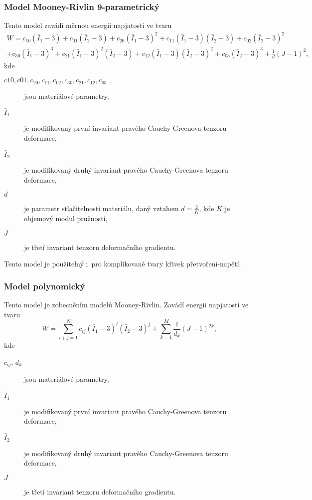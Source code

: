 \subsubsection{Model Mooney-Rivlin 9-parametrický}
Tento model zavádí měrnou energii napjatosti ve tvaru
\begin{multline}
W
= c_{10} \left(\bar{I}_1 - 3\right)
+ c_{01} \left(\bar{I}_2 - 3\right)
+ c_{20} \left(\bar{I}_1 - 3\right)^2
+ c_{11} \left(\bar{I}_1 - 3\right) \left(\bar{I}_2 - 3\right)
+ c_{02} \left(\bar{I}_2 - 3\right)^2\\
+ c_{30} \left(\bar{I}_1 - 3\right)^3
+ c_{21} \left(\bar{I}_1 - 3\right)^2 \left(\bar{I}_2 - 3\right)
+ c_{12} \left(\bar{I}_1 - 3\right) \left(\bar{I}_2 - 3\right)^2
+ c_{03} \left(\bar{I}_2 - 3\right)^3
+ \frac{1}{d} \left(J - 1\right)^2,
\end{multline}
kde
\begin{description}
	\item[$c10, c01, c_{20}, c_{11}, c_{02}, c_{30}, c_{21}, c_{12}, c_{03}$] jsou materiálové parametry,
	\item[$\bar{I}_1$] je modifikovaný první invariant pravého Cauchy-Greenova tenzoru deformace,
	\item[$\bar{I}_2$] je modifikovaný druhý invariant pravého Cauchy-Greenova tenzoru deformace,
	\item[$d$] je parametr stlačitelnosti materiálu, daný vztahem $d = \frac{2}{K}$, kde $K$ je objemový modul pružnosti,
	\item[$J$] je třetí invariant tenzoru deformačního gradientu.
\end{description}

Tento model je použitelný i~pro komplikované tvary křivek přetvoření-napětí.

\subsubsection{Model polynomický}\label{sec:polynomicky-model}
Tento model je zobecněním modelů Mooney-Rivlin.
Zavádí energii napjatosti ve tvaru
\begin{equation}
W
= \sum\limits_{i+j=1}^N c_{ij} \left(\bar{I}_1 - 3\right)^i \left(\bar{I}_2 - 3\right)^j
+ \sum\limits_{k=1}^M \frac{1}{d_k} \left(J - 1\right)^{2k},
\end{equation}
kde
\begin{description}
	\item[$c_{ij}$, $d_k$] jsou materiálové parametry,
	\item[$\bar{I}_1$] je modifikovaný první invariant pravého Cauchy-Greenova tenzoru deformace,
	\item[$\bar{I}_2$] je modifikovaný druhý invariant pravého Cauchy-Greenova tenzoru deformace,
	\item[$J$] je třetí invariant tenzoru deformačního gradientu.
\end{description}

